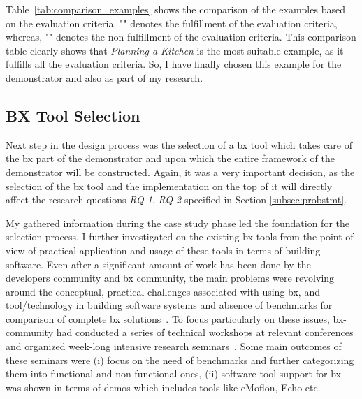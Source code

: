 Table~\ref{tab:comparison_examples} shows the comparison of the examples based on the evaluation criteria. "\checkmark" denotes the fulfillment of the evaluation criteria, whereas, "" denotes the non-fulfillment of the evaluation criteria. This comparison table clearly shows that \textit{Planning a Kitchen} is the most suitable example, as it fulfills all the evaluation criteria. So, I have finally chosen this example for the demonstrator and also as part of my research.

\subsection{BX Tool Selection}\label{subsec:bxtoolselection}
Next step in the design process was the selection of a bx tool which takes care of the bx part of the demonstrator and upon which the entire framework of the demonstrator will be constructed. Again, it was a very important decision, as the selection of the bx tool and the implementation on the top of it will directly affect the research questions \textit{RQ 1}, \textit{RQ 2}  specified in Section \ref{subsec:probstmt}.

My gathered information during the case study phase led the foundation for the selection process. I further investigated on the existing bx tools from the point of view of practical application and usage of these tools in terms of building software. Even after a significant amount of work has been done by the developers community and bx community, the main problems were revolving around the conceptual, practical challenges associated with using bx, and tool/technology in building software systems and absence of benchmarks for comparison of complete bx solutions~\cite{bx-theoryandappl}.
To focus particularly on these issues, bx-community had conducted a series of technical workshops at relevant conferences and organized week-long intensive research seminars~\cite{bx-theoryandappl}. Some main outcomes of these seminars were (i) focus on the need of benchmarks and further categorizing them into functional and non-functional ones, (ii) software tool support for bx was shown in terms of demos which includes tools like eMoflon, Echo etc.

